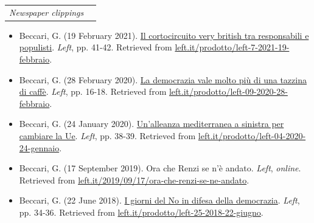 \documentclass{article}
\begin{document}
\vspace{.5cm}
\begin{minipage}[l]{0.9\textwidth}
\begin{tabular}{l l}
{\Large\emph{Newspaper clippings}}&
\end{tabular}
\end{minipage}
\begin{itemize}
	\item Beccari, G. (19 February 2021). \href{https://drive.google.com/file/d/1RJjb_NYHRQJuJL1Ct_NIC1JY4ghjUKFN/view?usp=sharing}{Il cortocircuito very british tra responsabili e populisti}. \emph{Left}, pp. 41-42. Retrieved from \href{https://left.it/prodotto/left-7-2021-19-febbraio/}{left.it/prodotto/left-7-2021-19-febbraio}.
	\item Beccari, G. (28 February 2020). \href{https://drive.google.com/file/d/12eMlPPYv0zkwV9pps5MDUAXg7xedHXWQ/view?usp=sharing}{La democrazia vale molto pi\`{u} di una tazzina di caff\`{e}}. \emph{Left}, pp. 16-18. Retrieved from \href{https://left.it/prodotto/left-09-2020-28-febbraio/}{left.it/prodotto/left-09-2020-28-febbraio}.
	\item Beccari, G. (24 January 2020). \href{https://drive.google.com/file/d/1Y1Os38_OUXrn-mcmEBtSLTLP51gef8t0/view?usp=sharing}{Un'alleanza mediterranea a sinistra per cambiare la Ue}. \emph{Left}, pp. 38-39. Retrieved from \href{https://left.it/prodotto/left-04-2020-24-gennaio/}{left.it/prodotto/left-04-2020-24-gennaio}.
	\item Beccari, G. (17 September 2019). Ora che Renzi se n'\`{e} andato. \emph{Left}, \emph{online}.\\Retrieved from \href{https://left.it/2019/09/17/ora-che-renzi-se-ne-andato/}{left.it/2019/09/17/ora-che-renzi-se-ne-andato}.
	\item Beccari, G. (22 June 2018). \href{https://drive.google.com/file/d/1H45w6Nl8rC7DEIN6xY2U8QMRodIM5SZ9/view?usp=sharing}{I giorni del No in difesa della democrazia}. \emph{Left}, pp. 34-36. Retrieved from \href{https://left.it/prodotto/left-25-2018-22-giugno/}{left.it/prodotto/left-25-2018-22-giugno}.
\end{itemize}

\end{document}
